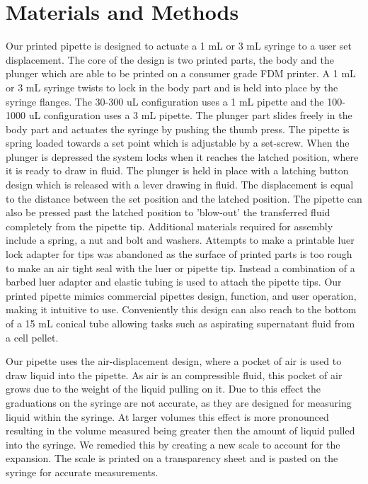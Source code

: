 \documentclass[10pt,letterpaper]{article}
\begin{document}

\section*{Materials and Methods}

Our printed pipette is designed to actuate a 1 mL or 3 mL syringe to a user set displacement.
The core of the design is two printed parts, the body and the plunger which are able to be printed on a consumer grade FDM printer.
A 1 mL or 3 mL syringe twists to lock in the body part and is held into place by the syringe flanges.
The 30-300 uL configuration uses a 1 mL pipette and the 100-1000 uL configuration uses a 3 mL pipette.
The plunger part slides freely in the body part and actuates the syringe by pushing the thumb press. 
The pipette is spring loaded towards a set point which is adjustable by a set-screw. 
When the plunger is depressed the system locks when it reaches the latched position, where it is ready to draw in fluid.
The plunger is held in place with a latching button design which is released with a lever drawing in fluid.
The displacement is equal to the distance between the set position and the latched position.
The pipette can also be pressed past the latched position to 'blow-out' the transferred fluid completely from the pipette tip.   
Additional materials required for assembly include a spring, a nut and bolt and washers.
Attempts to make a printable luer lock adapter for tips was abandoned as the surface of printed parts is too rough to make an air tight seal with the luer or pipette tip.
Instead a combination of a barbed luer adapter and elastic tubing is used to attach the pipette tips.
Our printed pipette mimics commercial pipettes design, function, and user operation, making it intuitive to use.
Conveniently this design can also reach to the bottom of a 15 mL conical tube allowing tasks such as aspirating supernatant fluid from a cell pellet.

Our pipette uses the air-displacement design, where a pocket of air is used to draw liquid into the pipette.
As air is an compressible fluid, this pocket of air grows due to the weight of the liquid pulling on it.
Due to this effect the graduations on the syringe are not accurate, as they are designed for measuring liquid within the syringe.
At larger volumes this effect is more pronounced resulting in the volume measured being greater then the amount of liquid pulled into the syringe.
We remedied this by creating a new scale to account for the expansion.
The scale is printed on a transparency sheet and is pasted on the syringe for accurate measurements. 
\end{document}
